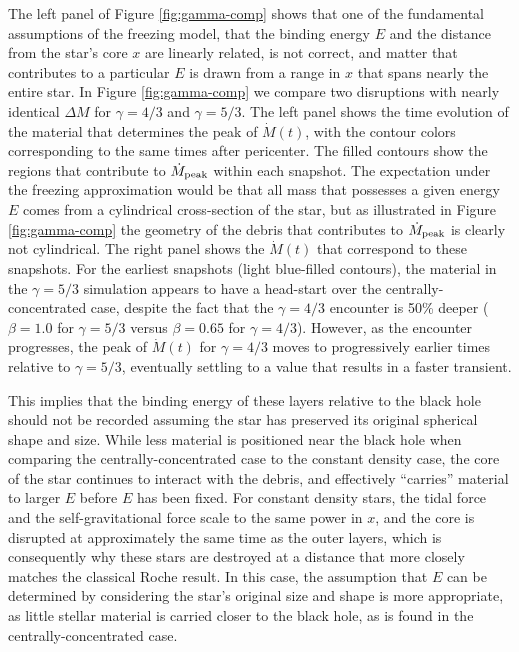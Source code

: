 \documentclass[twocolumn]{emulateapj}
\newcommand{\md}{\dot{M}\left(t\right)}
\newcommand{\mdpeak}{\dot{M}_{\rm peak}}
\begin{document}
The left panel of Figure \ref{fig:gamma-comp} shows that one of the fundamental assumptions of the freezing model, that the binding energy $E$ and the distance from the star's core $x$ are linearly related, is not correct, and matter that contributes to a particular $E$ is drawn from a range in $x$ that spans nearly the entire star. In Figure \ref{fig:gamma-comp} we compare two disruptions with nearly identical $\Delta M$ for $\gamma = 4/3$ and $\gamma = 5/3$. The left panel shows the time evolution of the material that determines the peak of $\md$, with the contour colors corresponding to the same times after pericenter. The filled contours show the regions that contribute to $\mdpeak$ within each snapshot. The expectation under the freezing approximation would be that all mass that possesses a given energy $E$ comes from a cylindrical cross-section of the star, but as illustrated in  Figure \ref{fig:gamma-comp}  the geometry of the debris that contributes to $\mdpeak$  is clearly not cylindrical. The right panel shows the $\md$ that correspond to these snapshots. For the earliest snapshots (light blue-filled contours), the material in the $\gamma = 5/3$ simulation appears to have a head-start over the centrally-concentrated case, despite the fact that the $\gamma = 4/3$ encounter is 50\% deeper ($\beta = 1.0$ for $\gamma = 5/3$ versus $\beta = 0.65$ for $\gamma = 4/3$). However, as the encounter progresses, the peak of $\md$ for $\gamma = 4/3$ moves to progressively earlier times relative to $\gamma = 5/3$, eventually settling to a value that results in a faster transient.

This implies that the binding energy of these layers relative to the black hole should not be recorded assuming the star has preserved its original spherical shape and size. While less material is positioned near the black hole when comparing the centrally-concentrated case to the constant density case, the core of the star continues to interact with the debris, and effectively ``carries'' material to larger $E$ before $E$ has been fixed. For constant density stars, the tidal force and the self-gravitational force scale to the same power in $x$, and the core is disrupted at approximately the same time as the outer layers, which is consequently why these stars are destroyed at a distance that more closely matches the classical Roche result. In this case, the assumption that $E$ can be determined by considering the star's original size and shape is more appropriate, as little stellar material is carried closer to the black hole, as is found in the centrally-concentrated case.
\end{document}
